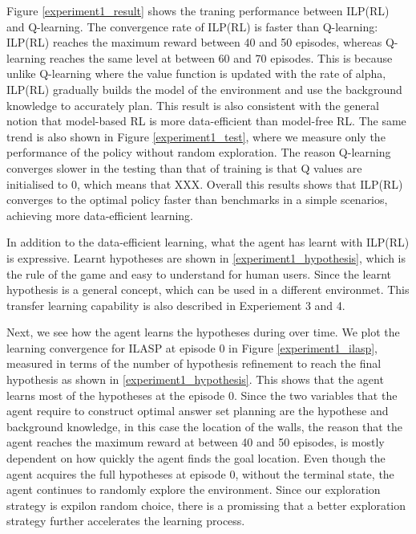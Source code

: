 Figure \ref{experiment1_result} shows the traning performance between ILP(RL) and Q-learning.
The convergence rate of ILP(RL) is faster than Q-learning: ILP(RL) reaches the maximum reward between 40 and 50 episodes, whereas Q-learning reaches the same level at between 60 and 70 episodes.
This is because unlike Q-learning where the value function is updated with the rate of alpha, ILP(RL) gradually builds the model of the environment and use the background knowledge to accurately plan.
This result is also consistent with the general notion that model-based RL is more data-efficient than model-free RL.
The same trend is also shown in Figure \ref{experiment1_test}, where we measure only the performance of the policy without random exploration.
The reason Q-learning converges slower in the testing than that of training is that Q values are initialised to 0, which means that XXX.
Overall this results shows that ILP(RL) converges to the optimal policy faster than benchmarks in a simple scenarios, achieving more data-efficient learning.



% 


In addition to the data-efficient learning, what the agent has learnt with ILP(RL) is expressive.
Learnt hypotheses are shown in \ref{experiment1_hypothesis}, which is the rule of the game and easy to understand for human users.
Since the learnt hypothesis is a general concept, which can be used in a different environmet.
This transfer learning capability is also described in Experiement 3 and 4.

Next, we see how the agent learns the hypotheses during over time. We plot the learning convergence for ILASP at episode 0 in Figure \ref{experiment1_ilasp}, measured in terms of the number of hypothesis refinement to reach the final hypothesis as shown in \ref{experiment1_hypothesis}.
This shows that the agent learns most of the hypotheses at the episode 0.
Since the two variables that the agent require to construct optimal answer set planning are the hypothese and background knowledge, in this case the location of the walls, 
the reason that the agent reaches the maximum reward at between 40 and 50 episodes, is mostly dependent on how quickly the agent finds the goal location.
Even though the agent acquires the full hypotheses at episode 0, without the terminal state, the agent continues to randomly explore the environment.
Since our exploration strategy is expilon random choice, there is a promissing that a better exploration strategy further accelerates the learning process.

